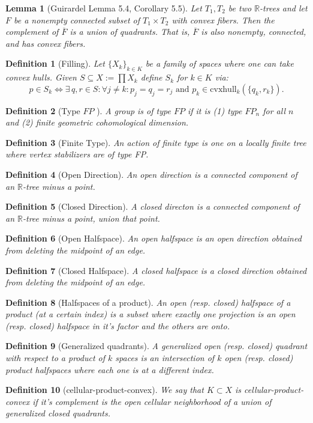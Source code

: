 \documentclass{article}
\theoremstyle{mystyle}
\newtheorem{lem}{Lemma}[section]
\newtheorem{defn}{Definition}
\theoremstyle{remark}
\begin{document}
\begin{lem}
	[Guirardel Lemma 5.4, Corollary 5.5]
 \label{lem:guirardel} 
	Let \(T_{1} , T_{2}\) be two \(\mathbb{R}\)-trees and let \(F\) be a nonempty connected subset of \(T_{1} \times T_{2}\) with convex fibers. Then the complement of \(\overline{F}\) is a union of quadrants. That is, \(\overline{F}\) is also nonempty, connected, and has convex fibers.
\end{lem}

\begin{defn}
	[Filling]
    Let \(\{X_{k}\}_{k \in K}\) be a family of spaces where one can take convex hulls. Given \(S \subseteq X := \prod X_{k}\) define \(S_{k}\) for \(k \in K\) via: \[p \in S_{k} \iff \exists \,q,r \in S: \forall j \neq k: p_{j} = q_{j} = r_{j} \text{ and } p_{k} \in \text{cvxhull}_k (\{q_{k} , r_{k}\}).\] 
\end{defn}
\begin{defn}
	[Type \(FP\) ]
	A group is of type \(FP\) if it is (1) type \(FP_n\) for all \(n\) and (2) finite geometric cohomological dimension.
\end{defn}

\begin{defn}
	[Finite Type] 
	An action of {\em finite type} is one on a locally finite tree where  vertex stabilizers are of type FP.
\end{defn}

\begin{defn}[Open Direction] An open direction is a connected component of an \(\mathbb{R}\)-tree minus a point. 
\end{defn}

\begin{defn}[Closed Direction] A closed directon is a connected component of an \(\mathbb{R}\)-tree minus a point, union that point.
\end{defn}
\begin{defn}[Open Halfspace] An open halfspace is an open direction obtained from deleting the midpoint of an edge.
\end{defn}
\begin{defn}[Closed Halfspace] A closed halfspace is a closed direction obtained from deleting the midpoint of an edge.
\end{defn}
\begin{defn}[Halfspaces of a product] An open (resp. closed) halfspace of a product (at a certain index) is a subset where exactly one projection is an open (resp. closed)  halfspace in it's factor and the others are onto.
\end{defn}
\begin{defn}[Generalized quadrants] A generalized open (resp. closed) quadrant with respect to a product of \(k\) spaces is an intersection of \(k\) open (resp. closed) product halfspaces where each one is at a different index.
\end{defn}
\begin{defn}[cellular-product-convex] We say that \(K \subset X\) is cellular-product-convex if it's complement is the open cellular neighborhood of a union of generalized closed quadrants.
\end{defn}
\end{document}
